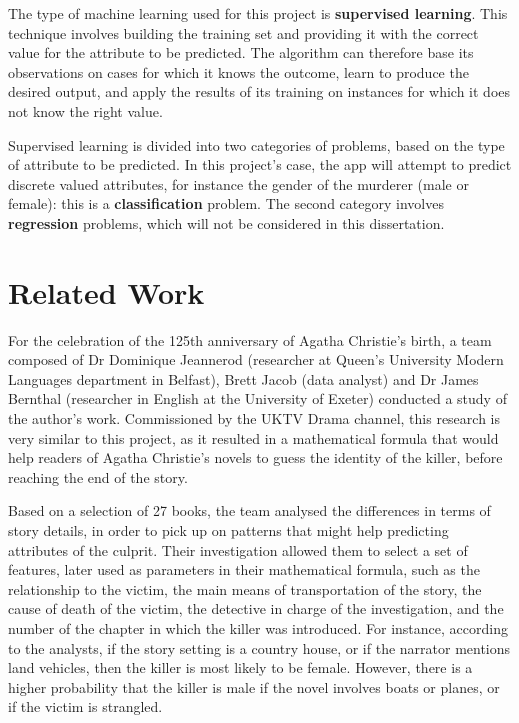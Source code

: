 \documentclass{mproj}
\begin{document}
The type of machine learning used for this project is \textbf{supervised learning}. This technique involves building the training set and providing it with the correct value for the attribute to be predicted. \cite{machinelearningcourse} The algorithm can therefore base its observations on cases for which it knows the outcome, learn to produce the desired output, and apply the results of its training on instances for which it does not know the right value. \par

Supervised learning is divided into two categories of problems, based on the type of attribute to be predicted. In this project's case, the app will attempt to predict discrete valued attributes, for instance the gender of the murderer (male or female): this is a \textbf{classification} problem. The second category involves \textbf{regression} problems, which will not be considered in this dissertation.


\section{Related Work}

For the celebration of the 125th anniversary of Agatha Christie's birth, a team composed of Dr Dominique Jeannerod (researcher at Queen's University Modern Languages department in Belfast), Brett Jacob (data analyst) and Dr James Bernthal (researcher in English at the University of Exeter) conducted a study of the author's work. \cite{whodunnitbelfast} \cite{whodunnitguardian}
Commissioned by the UKTV Drama channel, this research is very similar to this project, as it resulted in a mathematical formula that would help readers of Agatha Christie's novels to guess the identity of the killer, before reaching the end of the story. \par

Based on a selection of 27 books, the team analysed the differences in terms of story details, in order to pick up on patterns that might help predicting attributes of the culprit. Their investigation allowed them to select a set of features, later used as parameters in their mathematical formula, such as the relationship to the victim, the main means of transportation of the story, the cause of death of the victim, the detective in charge of the investigation, and the number of the chapter in which the killer was introduced. For instance, according to the analysts, if the story setting is a country house, or if the narrator mentions land vehicles, then the killer is most likely to be female. However, there is a higher probability that the killer is male if the novel involves boats or planes, or if the victim is strangled. \par
\end{document}
